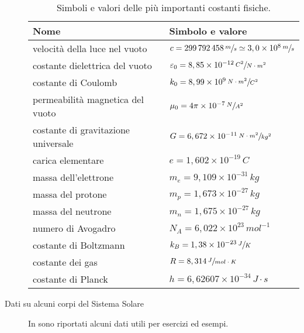 \documentclass[a4paper,11pt,italian]{article}
\begin{document}
\begin{description}
  \begin{table}[htp]\centering
    \begin{tabular}{ll}\toprule
      \textbf{Nome} & \textbf{Simbolo e valore}\\\midrule
      velocità della luce nel vuoto & $ c = 299\,  792\, 458\,	\sfrac{m}{s} \simeq 3,0 \times 10^8 \,	\sfrac{m}{s} $ \\\addlinespace[.2em]
      costante dielettrica del vuoto & $ \varepsilon_0 = 8,85\times 10^{-12} \, \sfrac{C^2}{N \cdot m^2} $ \\\addlinespace[.2em]
      costante di Coulomb & $ k_0 = 8,99 \times 10^9 \, \sfrac{N \cdot m^2}{C^2} $ \\\addlinespace[.2em]
      permeabilità magnetica del vuoto & $ \mu_0 = 4\pi \times 10^{-7} \, \sfrac{N}{A^2} $ \\\addlinespace[.2em]
      costante di gravitazione universale & $ G = 6,672 \times 10^{-11} \, \sfrac{N \cdot m^2}{kg^2} $ \\\addlinespace[.2em]
      carica elementare & $ e = 1,602 \times 10^{-19} \, C $ \\\addlinespace[.2em]
      massa dell'elettrone & $ m_e = 9,109 \times 10^{-31} \, kg $ \\\addlinespace[.2em]
      massa del protone & $ m_p = 1,673 \times 10^{-27} \, kg $ \\\addlinespace[.2em]
      massa del neutrone & $ m_n = 1,675 \times 10^{-27} \, kg $ \\\addlinespace[.2em]
      numero di Avogadro & $ N_A = 6,022 \times 10^{23} \, mol^{-1} $ \\\addlinespace[.2em]
      costante di Boltzmann & $ k_B = 1,38 \times 10^{-23} \, \sfrac{J}{K} $ \\\addlinespace[.2em]
      costante dei gas & $ R = 8,314 \, \sfrac{J}{mol \cdot K} $ \\\addlinespace[.2em]
      costante di Planck & $ h = 6,62607 \times 10^{-34} \, J\cdot s $ \\\bottomrule
    \end{tabular}
  \caption{Simboli e valori delle più importanti costanti fisiche.}
    \label{tab:costantimportanti}
  \end{table}  

  \item[Dati su alcuni corpi del Sistema Solare]
  In  sono riportati alcuni dati utili per esercizi ed esempi.


\end{description}
\end{document}
